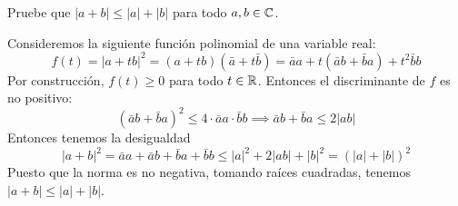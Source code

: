 \begin{exercise}
Pruebe que $|a + b| \le |a| + |b|$ para todo $a, b \in \mathbb C$.
\end{exercise}

\begin{solution}
Consideremos la siguiente función polinomial de una variable real:
$$f(t) = |a + tb|^2 = (a + tb) (\bar a + t \bar b) = \bar aa + t(\bar ab + \bar ba) + t^2 \bar bb$$
Por construcción, $f(t) \ge 0$ para todo $t \in \mathbb R$. Entonces el discriminante de $f$ es no positivo:
$$(\bar ab + \bar ba)^2 \le 4 \cdot \bar aa \cdot \bar bb \implies \bar ab + \bar ba \le 2|ab|$$
Entonces tenemos la desigualdad
$$|a + b|^2 = \bar aa + \bar ab + \bar ba + \bar bb \le |a|^2 + 2|ab| + |b|^2 = (|a| + |b|)^2$$
Puesto que la norma es no negativa, tomando raíces cuadradas, tenemos $|a + b| \le |a| + |b|$.
\end{solution}
